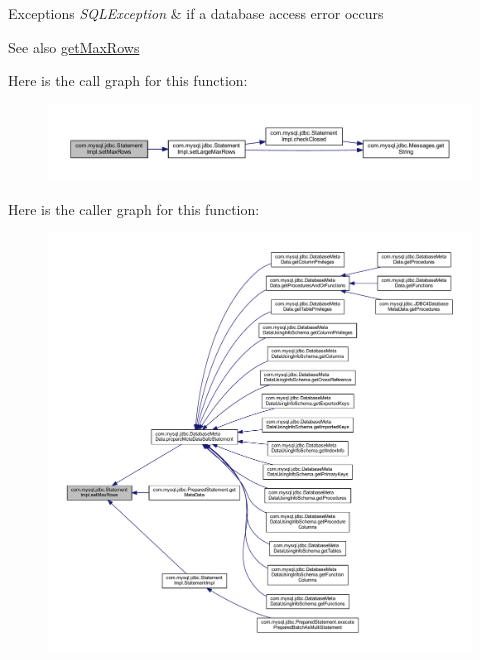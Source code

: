 \begin{DoxyExceptions}{Exceptions}
{\em S\+Q\+L\+Exception} & if a database access error occurs\\
\hline
\end{DoxyExceptions}
\begin{DoxySeeAlso}{See also}
\mbox{\hyperlink{classcom_1_1mysql_1_1jdbc_1_1_statement_impl_a5961bd894f79a6b3e2dedc7726527aab}{get\+Max\+Rows}} 
\end{DoxySeeAlso}
Here is the call graph for this function\+:
\nopagebreak
\begin{figure}[H]
\begin{center}
\leavevmode
\includegraphics[width=350pt]{classcom_1_1mysql_1_1jdbc_1_1_statement_impl_a06eb1d241e4ca066606cbf1a1e04e87c_cgraph}
\end{center}
\end{figure}
Here is the caller graph for this function\+:
\nopagebreak
\begin{figure}[H]
\begin{center}
\leavevmode
\includegraphics[width=350pt]{classcom_1_1mysql_1_1jdbc_1_1_statement_impl_a06eb1d241e4ca066606cbf1a1e04e87c_icgraph}
\end{center}
\end{figure}
\mbox{\label{classcom_1_1mysql_1_1jdbc_1_1_statement_impl_a74950809ec8d20dc5df1e6163120b342}} 
